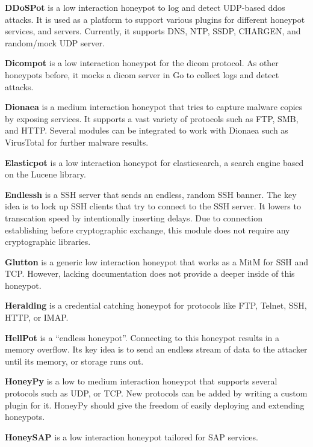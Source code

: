 \textbf{DDoSPot} \cite{ddosspot2021} is a low interaction honeypot to log and detect UDP-based \ac{ddos} attacks.
It is used as a platform to support various plugins for different honeypot services, and servers.
Currently, it supports DNS, NTP, SSDP, CHARGEN, and random/mock UDP server.

\textbf{Dicompot} \cite{dicompot2021} is a low interaction honeypot for the \ac{dicom} protocol.
As other honeypots before, it mocks a \ac{dicom} server in Go to collect logs and detect attacks.

\textbf{Dionaea} \cite{dionaea2021} is a medium interaction honeypot that tries to capture malware copies by exposing services.
It supports a vast variety of protocols such as FTP, SMB, and HTTP.
Several modules can be integrated to work with Dionaea such as VirusTotal for further malware results.

\textbf{Elasticpot} \cite{elasticpot2021} is a low interaction honeypot for elasticsearch, a search engine based on the Lucene library.

\textbf{Endlessh} \cite{endlessh2021} is a SSH server that sends an endless, random SSH banner.
The key idea is to lock up SSH clients that try to connect to the SSH server.
It lowers to transcation speed by intentionally inserting delays.
Due to connection establishing before cryptographic exchange, this module does not require any cryptographic libraries.

\textbf{Glutton} \cite{glutton2021} is a generic low interaction honeypot that works as a MitM for SSH and TCP.
However, lacking documentation does not provide a deeper inside of this honeypot.

\textbf{Heralding} \cite{heralding2021} is a credential catching honeypot for protocols like FTP, Telnet, SSH, HTTP, or IMAP.

\textbf{HellPot} \cite{hellpot2021} is a \enquote{endless honeypot}.
Connecting to this honeypot results in a memory overflow.
Its key idea is to send an endless stream of data to the attacker until its memory, or storage runs out.

\textbf{HoneyPy} \cite{honeysap2021} is a low to medium interaction honeypot that supports several protocols such as UDP, or TCP.
New protocols can be added by writing a custom plugin for it.
HoneyPy should give the freedom of easily deploying and extending honeypots.

\textbf{HoneySAP} \cite{honeysap2021} is a low interaction honeypot tailored for SAP services.

